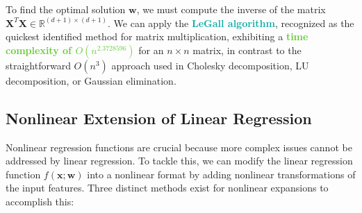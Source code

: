 \documentclass[twoside]{article}
\newcommand{\highlightbluetext}[1]{\textcolor[HTML]{09ACA6}{\textbf{#1}}}
\newcommand{\highlightgreentext}[1]{\textcolor[HTML]{62C92F}{\textbf{#1}}}
\numberwithin{equation}{section}
\begin{document}
	To find the optimal solution $\mathbf{w}$, we must compute the inverse of the matrix $\mathbf{X}^T \mathbf{X} \in \mathbb{R}^{(d + 1) \times (d + 1)}$. We can apply the \highlightbluetext{LeGall algorithm}, recognized as the quickest identified method for matrix multiplication, exhibiting a \highlightgreentext{time complexity of $O(n^{2.3728596})$} for an $n \times n$ matrix, in contrast to the straightforward $O(n^3)$ approach used in Cholesky decomposition, LU decomposition, or Gaussian elimination.

	\subsection{Nonlinear Extension of Linear Regression}
	\label{subsec:NonlinearExtensionOfLinearRegression}
	Nonlinear regression functions are crucial because more complex issues cannot be addressed by linear regression. To tackle this, we can modify the linear regression function $f(\mathbf{x}; \mathbf{w})$ into a nonlinear format by adding nonlinear transformations of the input features. Three distinct methods exist for nonlinear expansions to accomplish this:
\end{document}
